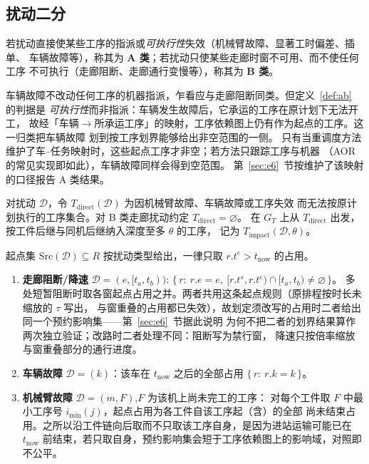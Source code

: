 \subsection{扰动二分}
\label{sec:disturbance_classes}

\begin{definition}[A/B 类扰动]
\label{def:ab}
若扰动直接使某些工序的指派或\emph{可执行性}失效（机械臂故障、显著工时偏差、插单、
车辆故障等），称其为 \textbf{A 类}；若扰动只使某些走廊时窗不可用、而不使任何工序
不可执行（走廊阻断、走廊通行变慢等），称其为 \textbf{B 类}。
\end{definition}

\begin{remark}[车辆故障为何属于 A 类]
\label{rem:agv_class}
车辆故障不改动任何工序的机器指派，乍看应与走廊阻断同类。但定义~\ref{def:ab} 的判据是
\emph{可执行性}而非指派：车辆发生故障后，它承运的工序在原计划下无法开工，
故经「车辆\(\to\)所承运工序」的映射，工序依赖图上仍有作为起点的工序。这一归类把车辆故障
划到按工序划界能够给出非空范围的一侧。
只有当重调度方法维护了车--任务映射时，这些起点工序才非空；若方法只跟踪工序与机器
（AOR 的常见实现即如此），车辆故障同样会得到空范围。
第~\ref{sec:e6}~节按维护了该映射的口径报告 A 类结果。
\end{remark}

\begin{definition}[工序依赖图上的直接集与影响域]
\label{def:task_impact}
对扰动 \(\mathcal{D}\)，令 \(T_{\mathrm{direct}}(\mathcal{D})\) 为因机械臂故障、车辆故障或工序失效
而无法按原计划执行的工序集合。对 B 类走廊扰动约定 \(T_{\mathrm{direct}}=\varnothing\)。
在 \(G_T\) 上从 \(T_{\mathrm{direct}}\) 出发，按工件后继与同机后继纳入深度至多 \(\theta\) 的工序，
记为 \(T_{\mathrm{impact}}(\mathcal{D},\theta)\)。
\end{definition}

\begin{definition}[作为起点的占用]
\label{def:seeds}
起点集 \(\mathrm{Src}(\mathcal{D})\subseteq R\) 按扰动类型给出，一律只取
\(r.t^e>t_{\mathrm{now}}\) 的占用。
\begin{enumerate}[label=(\alph*),leftmargin=1.6em,itemsep=0.15em]
\item \textbf{走廊阻断/降速} \(\mathcal{D}=(e,[t_a,t_b))\):
\(\{\,r:\ r.e=e,\ [r.t^s,r.t^e)\cap[t_a,t_b)\neq\varnothing\,\}\)。
多处短暂阻断时取各窗起点占用之并。两者共用这条起点规则（原排程按时长未缩放的 \(\tau\) 写出，
与窗重叠的占用都已失效），故划定须改写的占用时二者给出同一个预约影响集——第~\ref{sec:e6}~节据此说明
为何不把二者的划界结果算作两次独立验证；改路时二者处理不同：阻断写为禁行窗，
降速只按倍率缩放与窗重叠部分的通行进度。
\item \textbf{车辆故障} \(\mathcal{D}=(k)\)：该车在 \(t_{\mathrm{now}}\) 之后的全部占用
\(\{\,r:\ r.k=k\,\}\)。
\item \textbf{机械臂故障} \(\mathcal{D}=(m,F)\),\(F\) 为该机上尚未完工的工序：
对每个工件取 \(F\) 中最小工序号 \(i_{\min}(j)\)，起点占用为各工件自该工序起（含）的全部
尚未结束占用。之所以沿工件链向后取而不只取该工序自身，是因为进站运输可能已在
\(t_{\mathrm{now}}\) 前结束，若只取自身，预约影响集会短于工序依赖图上的影响域，对照即不公平。
\end{enumerate}
\end{definition}


